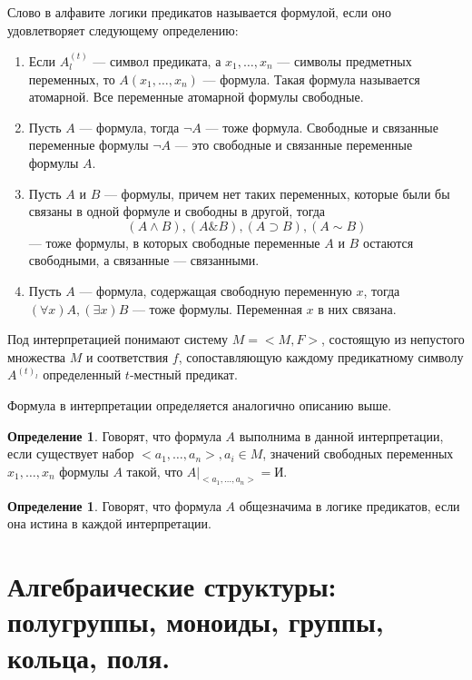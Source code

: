 \documentclass[12pt]{report}
\theoremstyle{definition}
\newtheorem{definition}[theorem]{Определение}
\begin{document}
Слово в алфавите логики предикатов называется формулой, если оно удовлетворяет
следующему определению:

\begin{enumerate}
\item Если $A^{(t)}_l$ --- символ предиката, а $x_1, \dots, x_n$ ---
  символы предметных переменных, то $A(x_1, \dots, x_n)$ --- формула.
  Такая формула называется атомарной. Все переменные атомарной формулы
  свободные.
\item Пусть $A$ ---  формула, тогда $\neg A$ --- тоже формула.
  Свободные и связанные переменные формулы $\neg A$ --- это свободные
  и связанные переменные формулы $A$.
\item Пусть $A$ и $B$ --- формулы, причем нет таких переменных, которые
  были бы связаны в одной формуле и свободны в другой, тогда
  $$
    (A \wedge B), (A \& B), (A \supset B), (A \sim B)
  $$ --- тоже формулы, в которых свободные переменные
  $A$ и $B$ остаются свободными, а связанные --- связанными.
\item Пусть $A$ --- формула, содержащая свободную переменную $x$, 
  тогда $(\forall x) A, (\exists x) B$ --- тоже формулы.
  Переменная $x$ в них связана.
\end{enumerate}

Под интерпретацией понимают систему $M = <M, F>$, состоящую
из непустого множества $M$ и соответствия $f$, сопоставляющую
каждому предикатному символу $A^{(t)_l}$ определенный $t$-местный
предикат.

Формула в интерпретации определяется аналогично описанию выше.

\begin{definition}
Говорят, что формула $A$ выполнима в данной интерпретации,
если существует набор $<a_1, \dots, a_n>, a_i \in M$, значений
свободных переменных $x_1, \dots, x_n$ формулы $A$ такой, что
$A|_{<a_1, \dots, a_n>} = \text{И}$.
\end{definition}

\begin{definition}
Говорят, что формула $A$ общезначима в логике предикатов,
если она истина в каждой интерпретации.
\end{definition}


\section{Алгебраические структуры: полугруппы, моноиды, группы, кольца, поля.}
\end{document}
